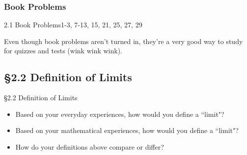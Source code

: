 \documentclass[cal1spr16Lectures.tex]{subfiles}
\begin{document}
\subsubsection{Book Problems}
\begin{frame}
\begin{block}{2.1 Book Problems}1-3, 7-13, 15, 21, 25, 27, 29\end{block}
Even though book problems aren't turned in, they're a very good way to study for quizzes and tests (wink wink wink).  
\end{frame}

\subsection[2.2 Definition of Limits]{\S 2.2 Definition of Limits}

\begin{frame}{\S 2.2 Definition of Limits}
\begin{que} 
\begin{itemize}
	\item Based on your everyday experiences, how would you define a ``limit"? 
	\item Based on your mathematical experiences, how would you define a ``limit"?
	\item How do your definitions above compare or differ?
\end{itemize}
\end{que}
\end{frame}
\end{document}
